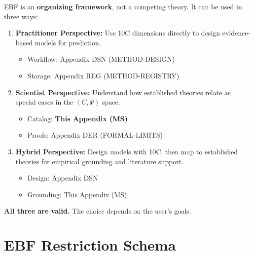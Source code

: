 \begin{tcolorbox}[colback=green!5!white, colframe=green!75!black,
    title=\textbf{Axiom MS-0: The Organizing Metatheory Principle}]

EBF is an \textbf{organizing framework}, not a competing theory. It can be
used in three ways:

\begin{enumerate}
    \item \textbf{Practitioner Perspective:} Use 10C dimensions directly to
          design evidence-based models for prediction.
          \begin{itemize}[nosep]
              \item Workflow: Appendix DSN (METHOD-DESIGN)
              \item Storage: Appendix REG (METHOD-REGISTRY)
          \end{itemize}

    \item \textbf{Scientist Perspective:} Understand how established theories
          relate as special cases in the $(C, \Psi)$ space.
          \begin{itemize}[nosep]
              \item Catalog: \textbf{This Appendix (MS)}
              \item Proofs: Appendix DER (FORMAL-LIMITS)
          \end{itemize}

    \item \textbf{Hybrid Perspective:} Design models with 10C, then map to
          established theories for empirical grounding and literature support.
          \begin{itemize}[nosep]
              \item Design: Appendix DSN
              \item Grounding: This Appendix (MS)
          \end{itemize}
\end{enumerate}

\textbf{All three are valid.} The choice depends on the user's goals.

\end{tcolorbox}

\section{EBF Restriction Schema}
\label{sec:ms-schema}

